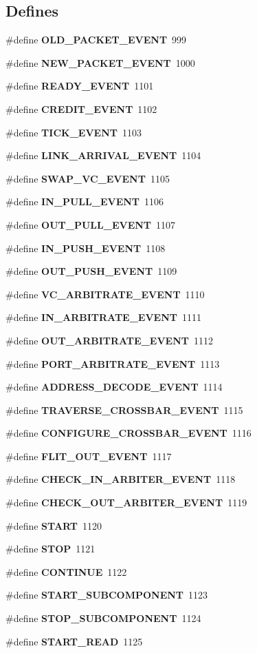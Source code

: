 \subsection*{Defines}
\begin{CompactItemize}
\item 
\#define {\bf OLD\_\-PACKET\_\-EVENT}~999
\item 
\#define {\bf NEW\_\-PACKET\_\-EVENT}~1000
\item 
\#define {\bf READY\_\-EVENT}~1101
\item 
\#define {\bf CREDIT\_\-EVENT}~1102
\item 
\#define {\bf TICK\_\-EVENT}~1103
\item 
\#define {\bf LINK\_\-ARRIVAL\_\-EVENT}~1104
\item 
\#define {\bf SWAP\_\-VC\_\-EVENT}~1105
\item 
\#define {\bf IN\_\-PULL\_\-EVENT}~1106
\item 
\#define {\bf OUT\_\-PULL\_\-EVENT}~1107
\item 
\#define {\bf IN\_\-PUSH\_\-EVENT}~1108
\item 
\#define {\bf OUT\_\-PUSH\_\-EVENT}~1109
\item 
\#define {\bf VC\_\-ARBITRATE\_\-EVENT}~1110
\item 
\#define {\bf IN\_\-ARBITRATE\_\-EVENT}~1111
\item 
\#define {\bf OUT\_\-ARBITRATE\_\-EVENT}~1112
\item 
\#define {\bf PORT\_\-ARBITRATE\_\-EVENT}~1113
\item 
\#define {\bf ADDRESS\_\-DECODE\_\-EVENT}~1114
\item 
\#define {\bf TRAVERSE\_\-CROSSBAR\_\-EVENT}~1115
\item 
\#define {\bf CONFIGURE\_\-CROSSBAR\_\-EVENT}~1116
\item 
\#define {\bf FLIT\_\-OUT\_\-EVENT}~1117
\item 
\#define {\bf CHECK\_\-IN\_\-ARBITER\_\-EVENT}~1118
\item 
\#define {\bf CHECK\_\-OUT\_\-ARBITER\_\-EVENT}~1119
\item 
\#define {\bf START}~1120
\item 
\#define {\bf STOP}~1121
\item 
\#define {\bf CONTINUE}~1122
\item 
\#define {\bf START\_\-SUBCOMPONENT}~1123
\item 
\#define {\bf STOP\_\-SUBCOMPONENT}~1124
\item 
\#define {\bf START\_\-READ}~1125

\end{CompactItemize}
